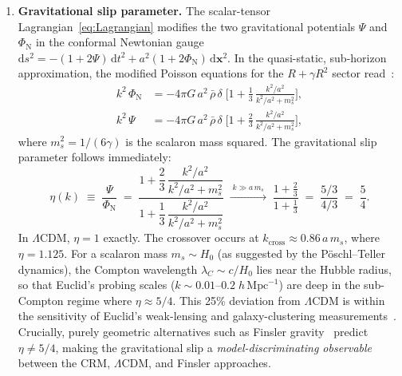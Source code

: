 \documentclass[12pt,a4paper]{article}
\theoremstyle{definition}
\theoremstyle{plain}
\theoremstyle{remark}
\begin{document}
\begin{enumerate}
  \item \textbf{Gravitational slip parameter.}\;
        The scalar-tensor Lagrangian~\eqref{eq:Lagrangian} modifies the
        two gravitational potentials $\Psi$ and $\Phi_{\mathrm{N}}$ in the
        conformal Newtonian gauge
        $\mathrm{d}s^{2} = -(1+2\Psi)\,\mathrm{d}t^{2}
        + a^{2}(1+2\Phi_{\mathrm{N}})\,\mathrm{d}\mathbf{x}^{2}$.
        In the quasi-static, sub-horizon approximation, the modified
        Poisson equations for the $R + \gamma R^{2}$ sector
        read~\cite{HuSawicki2007,SotiriouFaraoni2010}:
        \begin{align}
          k^{2}\,\Phi_{\mathrm{N}} &= -4\pi G\,a^{2}\,\bar{\rho}\,\delta
          \;\biggl[1 + \frac{1}{3}\,
          \frac{k^{2}/a^{2}}{k^{2}/a^{2} + m_{s}^{2}}\biggr],
          \label{eq:Poisson-Phi}\\[4pt]
          k^{2}\,\Psi &= -4\pi G\,a^{2}\,\bar{\rho}\,\delta
          \;\biggl[1 + \frac{2}{3}\,
          \frac{k^{2}/a^{2}}{k^{2}/a^{2} + m_{s}^{2}}\biggr],
          \label{eq:Poisson-Psi}
        \end{align}
        where $m_{s}^{2} = 1/(6\gamma)$ is the scalaron mass squared.
        The gravitational slip parameter follows immediately:
        \begin{equation}\label{eq:grav-slip}
          \eta(k) \;\equiv\; \frac{\Psi}{\Phi_{\mathrm{N}}}
          \;=\;
          \frac{1 + \dfrac{2}{3}\,
          \dfrac{k^{2}/a^{2}}{k^{2}/a^{2} + m_{s}^{2}}}
          {1 + \dfrac{1}{3}\,
          \dfrac{k^{2}/a^{2}}{k^{2}/a^{2} + m_{s}^{2}}}
          \;\xrightarrow{\;k \gg a\,m_{s}\;}
          \;\frac{1 + \tfrac{2}{3}}{1 + \tfrac{1}{3}}
          \;=\; \frac{5/3}{4/3}
          \;=\; \frac{5}{4}.
        \end{equation}
        In $\Lambda$CDM, $\eta = 1$ exactly. The crossover occurs at
        $k_{\mathrm{cross}} \approx 0.86\,a\,m_{s}$, where
        $\eta = 1.125$. For a scalaron mass $m_{s} \sim H_{0}$
        (as suggested by the P\"oschl--Teller dynamics), the Compton
        wavelength $\lambda_{C} \sim c/H_{0}$ lies near the Hubble
        radius, so that Euclid's probing scales
        ($k \sim 0.01$--$0.2\;h\,\mathrm{Mpc}^{-1}$) are deep in the
        sub-Compton regime where $\eta \approx 5/4$. This 25\%
        deviation from $\Lambda$CDM is within the sensitivity of
        Euclid's weak-lensing and galaxy-clustering
        measurements~\cite{HuSawicki2007}. Crucially, purely geometric
        alternatives such as Finsler gravity~\cite{FinslerJCAP2025}
        predict $\eta \neq 5/4$, making the gravitational slip a
        \emph{model-discriminating observable} between the CRM,
        $\Lambda$CDM, and Finsler approaches.


\end{enumerate}
\end{document}
